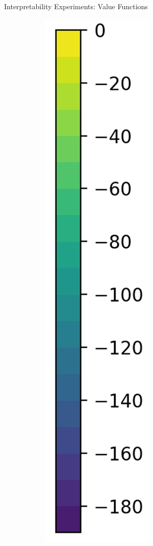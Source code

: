 \documentclass{beamer}
\begin{document}
\begin{frame}{Interpretability Experiments: Value Functions}
\begin{figure}[t]
\begin{subfigure}{0.05\linewidth}
      \includegraphics[width=\linewidth,trim=0 0 0 0,clip]{assets/ref_plots/r10c10_colorbar}

\end{subfigure}
\end{figure}
\end{frame}
\end{document}
